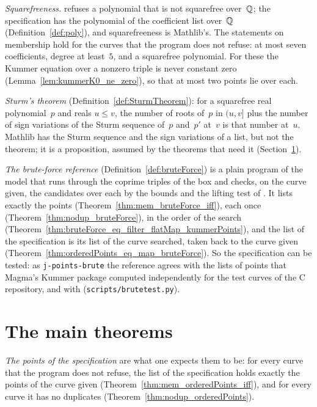 \emph{Squarefreeness.} \jpoints{} refuses a polynomial that is not squarefree over~$\mathbb{Q}$; the
specification has the polynomial of the coefficient list over~$\mathbb{Q}$ (Definition~\ref{def:poly}), and
squarefreeness is Mathlib's. The statements on membership hold for the curves that the program does
not refuse: at most seven coefficients, degree at least~$5$, and a squarefree polynomial. For these
the Kummer equation over a nonzero triple is never constant zero (Lemma~\ref{lem:kummerK0_ne_zero}),
so that at most two points lie over each.

\emph{Sturm's theorem} (Definition~\ref{def:SturmTheorem}): for a squarefree real polynomial~$p$ and
reals $u \le v$, the number of roots of~$p$ in $(u, v]$ plus the number of sign variations of the
Sturm sequence of~$p$ and~$p'$ at~$v$ is that number at~$u$. Mathlib has the Sturm sequence and the
sign variations of a list, but not the theorem; it is a proposition, assumed by the theorems that
need it (Section~\ref{sec:overviewTheorems}).

\emph{The brute-force reference} (Definition~\ref{def:bruteForce}) is a plain program of the model
that runs through the coprime triples of the box and checks, on the curve given, the candidates over
each by the bounds and the lifting test of \jpoints{}. It lists exactly the points
(Theorem~\ref{thm:mem_bruteForce_iff}), each once (Theorem~\ref{thm:nodup_bruteForce}), in the order
of the search (Theorem~\ref{thm:bruteForce_eq_filter_flatMap_kummerPoints}), and the list of the
specification is its list of the curve searched, taken back to the curve given
(Theorem~\ref{thm:orderedPoints_eq_map_bruteForce}). So the specification can be tested: as
\verb|j-points-brute| the reference agrees with the lists of points that Magma's Kummer package
computed independently for the test curves of the C repository, and with \jpoints{}
(\verb|scripts/brutetest.py|).

\section{The main theorems}\label{sec:overviewTheorems}

\emph{The points of the specification} are what one expects them to be: for every curve that the
program does not refuse, the list of the specification holds exactly the points of the curve given
(Theorem~\ref{thm:mem_orderedPoints_iff}), and for every curve it has no duplicates
(Theorem~\ref{thm:nodup_orderedPoints}).

